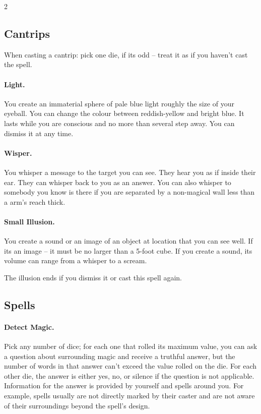 

\begin{multicols*}{2}

\subsection*{Cantrips}

When casting a cantrip: pick one die, if its odd -- treat it as if you haven't cast the spell.

\paragraph{Light.} You create an immaterial sphere of pale blue light roughly the size of your eyeball. 
You can change the colour between reddish-yellow and bright blue. 
It lasts while you are conscious and no more than several step away. 
You can dismiss it at any time.

\paragraph{Wisper.} You whisper a message to the target you can see. 
They hear you as if inside their ear. 
They can whisper back to you as an answer. 
You can also whisper to somebody you know is there if you are separated by a non-magical wall less than a arm's reach thick.

\paragraph{Small Illusion.} You create a sound or an image of an object at location that you can see well.
If its an image -- it must be no larger than a 5-foot cube. If you create a sound, its volume can range from a whisper to a scream.

The illusion ends if you dismiss it or cast this spell again. 

\subsection*{Spells}

\paragraph*{Detect Magic.}

Pick any number of dice; for each one that rolled its maximum value, you can ask a question about surrounding magic and receive a truthful answer, but the number of words in that answer can't exceed the value rolled on the die.
For each other die, the answer is either yes, no, or silence if the question is not applicable.
Information for the answer is provided by yourself and spells around you.
For example, spells usually are not directly marked by their caster and are not aware of their surroundings beyond the spell's design.


\end{multicols*}
